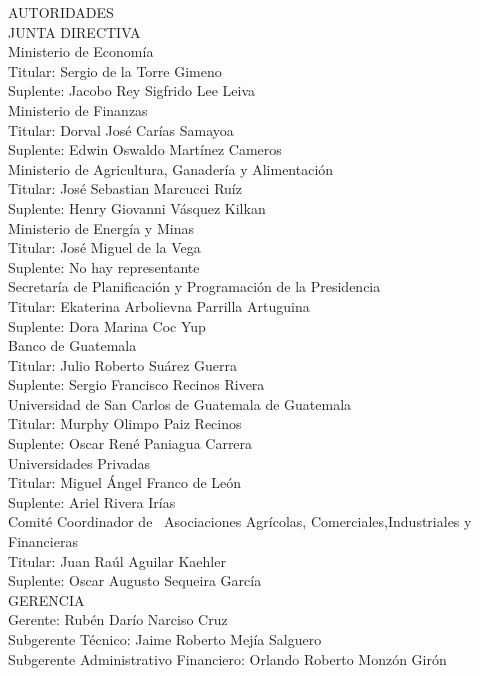 \begin{center}
	{\Bold \LARGE AUTORIDADES}\\[1cm]
	
	
	{\Bold \large \color{color1!89!black} JUNTA  DIRECTIVA} \\[0.4cm]
	
	{ \Bold Ministerio de Economía}          \\
	Titular: Sergio de la Torre Gimeno   \\
	Suplente: Jacobo Rey Sigfrido Lee Leiva  \\ [0.4cm]
	
	{\Bold Ministerio de Finanzas} \\
	Titular: Dorval José Carías Samayoa \\
	Suplente: Edwin Oswaldo Martínez Cameros\\[0.4cm]
	
	{\Bold Ministerio de Agricultura, Ganadería y Alimentación} \\
	Titular: José Sebastian Marcucci Ruíz   \\
	Suplente: Henry Giovanni Vásquez Kilkan \\ [0.4cm]
	
	{\Bold Ministerio de Energía y Minas}\\
	Titular: José Miguel de la Vega \\
	Suplente: No hay representante\\ [0.4cm]
	{\Bold Secretaría de Planificación y Programación de la Presidencia}   \\
	Titular: Ekaterina Arbolievna Parrilla Artuguina   \\
	Suplente: Dora Marina Coc Yup\\ [0.4cm]
	{\Bold Banco de Guatemala} \\
	Titular: Julio Roberto Suárez Guerra \\
	Suplente: Sergio Francisco Recinos Rivera\\ [0.4cm]
	{\Bold Universidad de San Carlos de Guatemala de Guatemala} \\
	Titular: Murphy Olimpo Paiz Recinos   \\
	Suplente: Oscar René Paniagua Carrera  \\ [0.4cm]
	{\Bold Universidades Privadas} \\
	Titular: Miguel Ángel Franco de León \\             Suplente: Ariel Rivera Irías\\ [0.4cm]
	{\Bold Comité Coordinador de \ Asociaciones  Agrícolas, Comerciales,Industriales y Financieras} \\
	Titular: Juan Raúl Aguilar Kaehler \\
	Suplente:  Oscar Augusto Sequeira García  \\ [0.4cm]
	
	{\Bold \large \color{color1!89!black} GERENCIA}\\[0.2cm]
	Gerente:  Rubén Darío Narciso Cruz        \\
	Subgerente Técnico:  Jaime Roberto Mejía Salguero\\
	Subgerente Administrativo Financiero:  Orlando Roberto Monzón Girón\\
\end{center}

